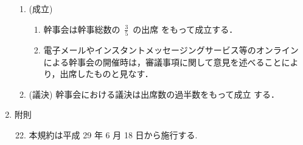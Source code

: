 \begin{enumerate}
\begin{enumerate}
\item    (成立) 
\begin{enumerate}
    \item 幹事会は幹事総数の~\(\displaystyle{\frac{3}{5}}\)~の出席
をもって成立する．\\
    \item 電子メールやインスタントメッセージングサービス等のオンラインによる幹事会の開催時は，審議事項に関して意見を述べることにより，出席したものと見なす．
\end{enumerate}
%
\item    (議決) 幹事会における議決は出席数の過半数をもって成立
                する．\\
\end{enumerate}
%
\item	附則\\
%
\begin{enumerate}
\setcounter{enumii}{21}
\item	本規約は平成 29 年  6 月 18 日から施行する. \\
%
\end{enumerate}
%
\end{enumerate}
%

